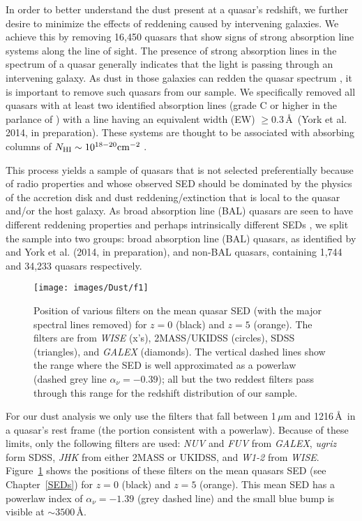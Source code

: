 In order to better understand the dust present at a quasar's redshift, we further desire to minimize the effects of reddening caused by intervening galaxies.  We achieve this by removing 16,450 quasars that show signs of strong absorption line systems along the line of sight.
The presence of strong absorption lines in the spectrum of a quasar generally indicates that the light is passing through an intervening galaxy.  As dust in those galaxies can redden the quasar spectrum \citep{York:2006,Menard:2008,Khare:2012}, it is important to remove such quasars from our sample.
We specifically removed all quasars with at least two identified absorption lines (grade C or higher in the parlance of \citet{York:2005}) with a  line having an equivalent width (EW) $\geq0.3$\,\AA\ (York et al. 2014, in preparation).   These systems are thought to be associated with absorbing columns of $N_{\rm HI} \sim 10^{18-20} {\rm cm^{-2}}$ \citep{Churchill:2005,Prochaska:2010}.

This process yields a sample of quasars that is not selected preferentially because of radio properties and whose observed SED should be dominated by the physics of the accretion disk and dust reddening/extinction that is local to the quasar and/or the host galaxy.  As broad absorption line (BAL) quasars are seen to have different reddening properties \citep{Sprayberry:1992} and perhaps intrinsically different SEDs \citep{Weymann:1991,Reichard:2003b}, we split the sample into two groups: broad absorption line (BAL) quasars, as
identified by \citet{Shen:2011} and York et al. (2014, in preparation), and non-BAL quasars, containing 1,744 and 34,233 quasars respectively.

\begin{figure}[t]
\begin{center}
\texttt{[image: images/Dust/f1]}
\caption[Filter position vs. redshift]{\label{fig:sed_redshift} Position of various filters on the mean quasar SED (with the major spectral lines removed) for $z=0$ (black) and $z=5$ (orange).  The filters are from {\em WISE} (x's), 2MASS/UKIDSS (circles), SDSS (triangles), and {\em GALEX} (diamonds).  The vertical dashed lines show the range where the SED is well approximated as a powerlaw (dashed grey line $\alpha_\nu=-0.39$); all but the two reddest filters pass through this range for the redshift distribution of our sample.}
\end{center}
\end{figure}

For our dust analysis we only use the filters that fall between 1\,$\mu$m and 1216\,\AA\ in a quasar's rest frame (the portion consistent with a powerlaw). Because of these limits, only the following filters are used: {\em NUV} and {\em FUV} from {\em GALEX}, {\em ugriz} form SDSS, {\em JHK} from either 2MASS or UKIDSS, and {\em W1-2} from {\em WISE}.  Figure~\ref{fig:sed_redshift} shows the positions of these filters on the mean quasars SED (see Chapter~\ref{SEDs}) for $z=0$ (black) and $z=5$ (orange).  This mean SED has a powerlaw index of $\alpha_\nu=-1.39$ (grey dashed line) and the small blue bump is visible at $\sim3500$\,\AA.

